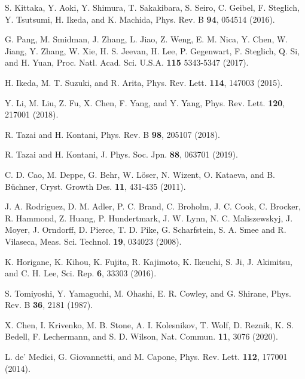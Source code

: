 \documentclass[aps,prl,onecolumn,amsmath,amssymb,superscriptaddress]{revtex4}
\begin{document}
\begin{thebibliography}{}
 S. Kittaka, Y. Aoki, Y. Shimura, T. Sakakibara, S. Seiro, C. Geibel, F. Steglich, Y. Tsutsumi, H. Ikeda, and K. Machida, Phys. Rev. B {\bf 94}, 054514 (2016).

 G. Pang, M. Smidman, J. Zhang, L. Jiao, Z. Weng, E. M. Nica, Y. Chen, W. Jiang, Y. Zhang, W. Xie, H. S. Jeevan, H. Lee, P. Gegenwart, F. Steglich, Q. Si, and H. Yuan, Proc. Natl. Acad. Sci. U.S.A. {\bf 115} 5343-5347 (2017).

 H. Ikeda, M. T. Suzuki, and R. Arita, Phys. Rev. Lett. {\bf 114}, 147003 (2015). 

 Y. Li, M. Liu, Z. Fu, X. Chen, F. Yang, and Y. Yang, Phys. Rev. Lett. {\bf 120}, 217001 (2018).

 R. Tazai and H. Kontani, Phys. Rev. B {\bf 98}, 205107 (2018).

 R. Tazai and H. Kontani, J. Phys. Soc. Jpn. {\bf 88}, 063701 (2019).

 C. D. Cao, M. Deppe, G. Behr, W. L\"{o}ser, N. Wizent, O. Kataeva, and B. B\"{u}chner, Cryst. Growth Des. {\bf 11}, 431-435 (2011).

 J. A. Rodriguez, D. M. Adler, P. C. Brand, C. Broholm, J. C. Cook, C. Brocker, R. Hammond, Z. Huang, P. Hundertmark, J. W. Lynn, N. C. Maliszewskyj, J. Moyer, J. Orndorff, D. Pierce, T. D. Pike, G. Scharfstein, S. A. Smee and R. Vilaseca, Meas. Sci. Technol. {\bf 19}, 034023 (2008).

 K. Horigane, K. Kihou, K. Fujita, R. Kajimoto, K. Ikeuchi, S. Ji, J. Akimitsu, and C. H. Lee, Sci. Rep. {\bf 6}, 33303 (2016).

 S. Tomiyoshi, Y. Yamaguchi, M. Ohashi, E. R. Cowley, and G. Shirane, Phys. Rev. B {\bf 36}, 2181 (1987).

 X. Chen, I. Krivenko, M. B. Stone, A. I. Kolesnikov, T. Wolf, D. Reznik, K. S. Bedell, F. Lechermann, and S. D. Wilson, Nat. Commun. {\bf 11}, 3076 (2020).



 L. de' Medici, G. Giovannetti, and M. Capone, Phys. Rev. Lett. {\bf 112}, 177001 (2014).


\end{thebibliography}
\end{document}
